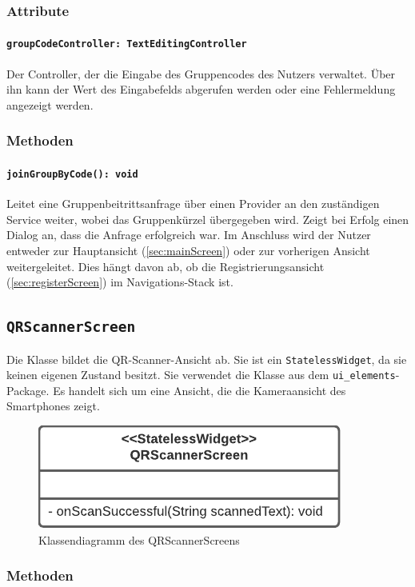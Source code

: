 \documentclass{entwurfsheft}
\begin{document}
\begin{sloppypar}
\subsubsection*{Attribute}
\paragraph{\texttt{groupCodeController: TextEditingController}}
Der Controller, der die Eingabe des Gruppencodes des Nutzers verwaltet. Über ihn kann der Wert des Eingabefelds abgerufen werden oder eine Fehlermeldung angezeigt werden.
\subsubsection*{Methoden}
\paragraph{\texttt{joinGroupByCode(): void}}
Leitet eine Gruppenbeitrittsanfrage über einen Provider an den zuständigen Service weiter, wobei das Gruppenkürzel übergegeben wird. Zeigt bei Erfolg einen \Gls{Dialog} an, dass die Anfrage erfolgreich war. Im Anschluss wird der Nutzer entweder zur Hauptansicht (\ref{sec:mainScreen}) oder zur vorherigen Ansicht weitergeleitet. Dies hängt davon ab, ob die Registrierungsansicht (\ref{sec:registerScreen}) im Navigations-Stack ist.
\newpage

\subsection{\texttt{QRScannerScreen}}
\label{sec:qrScannerScreen}
Die Klasse bildet die QR-Scanner-Ansicht ab. Sie ist ein \texttt{StatelessWidget}, da sie keinen eigenen Zustand besitzt. Sie verwendet die Klasse  aus dem \texttt{ui\_elements}-Package. Es handelt sich um eine Ansicht, die die Kameraansicht des Smartphones zeigt.
\begin{figure}
    [htp]
    \centering
    \includegraphics[width=.49\textwidth]{images/presentationLayer/classDiagrams/qrScannerScreen.pdf}
    \caption{Klassendiagramm des QR\-Scanner\-Screens}
\end{figure}
\subsubsection*{Methoden}

\end{sloppypar}
\end{document}
